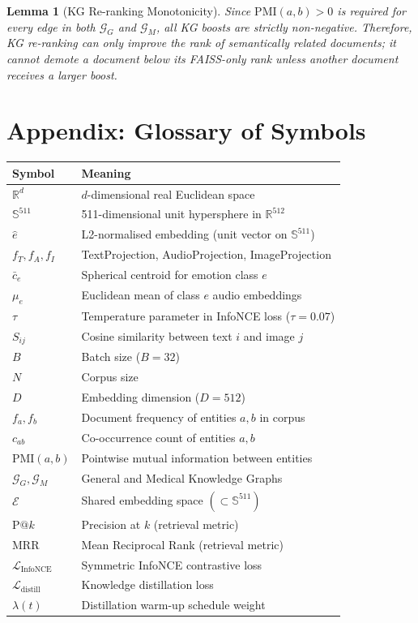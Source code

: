\documentclass[12pt, a4paper]{article}
\theoremstyle{definition}
\theoremstyle{plain}
\newtheorem{lemma}[theorem]{Lemma}
\theoremstyle{remark}
\newcommand{\R}{\mathbb{R}}
\newcommand{\Sphere}{\mathbb{S}}
\newcommand{\KG}{\mathcal{G}}
\newcommand{\Emb}{\mathcal{E}}
\begin{document}
\begin{lemma}[KG Re-ranking Monotonicity]
Since $\text{PMI}(a,b) > 0$ is required for every edge in both $\KG_G$ and $\KG_M$, all KG boosts are strictly non-negative. Therefore, KG re-ranking can only improve the rank of semantically related documents; it cannot demote a document below its FAISS-only rank unless another document receives a larger boost.
\end{lemma}

\section{Appendix: Glossary of Symbols}
\label{sec:glossary}

\begin{longtable}{ll}
\toprule
\textbf{Symbol} & \textbf{Meaning} \\
\midrule
$\R^d$ & $d$-dimensional real Euclidean space \\
$\Sphere^{511}$ & 511-dimensional unit hypersphere in $\R^{512}$ \\
$\hat{e}$ & L2-normalised embedding (unit vector on $\Sphere^{511}$) \\
$f_T, f_A, f_I$ & TextProjection, AudioProjection, ImageProjection \\
$\bar{c}_e$ & Spherical centroid for emotion class $e$ \\
$\mu_e$ & Euclidean mean of class $e$ audio embeddings \\
$\tau$ & Temperature parameter in InfoNCE loss ($\tau = 0.07$) \\
$S_{ij}$ & Cosine similarity between text $i$ and image $j$ \\
$B$ & Batch size ($B = 32$) \\
$N$ & Corpus size \\
$D$ & Embedding dimension ($D = 512$) \\
$f_a, f_b$ & Document frequency of entities $a, b$ in corpus \\
$c_{ab}$ & Co-occurrence count of entities $a, b$ \\
$\text{PMI}(a,b)$ & Pointwise mutual information between entities \\
$\KG_G, \KG_M$ & General and Medical Knowledge Graphs \\
$\Emb$ & Shared embedding space $(\subset \Sphere^{511})$ \\
$\text{P}@k$ & Precision at $k$ (retrieval metric) \\
$\text{MRR}$ & Mean Reciprocal Rank (retrieval metric) \\
$\mathcal{L}_{\text{InfoNCE}}$ & Symmetric InfoNCE contrastive loss \\
$\mathcal{L}_{\text{distill}}$ & Knowledge distillation loss \\
$\lambda(t)$ & Distillation warm-up schedule weight \\
\bottomrule
\end{longtable}
\end{document}
